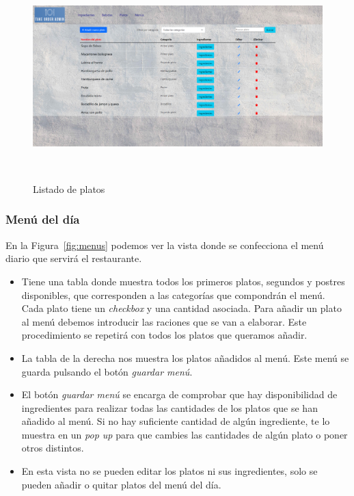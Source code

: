\begin{figure}[h]
    \centering
    \includegraphics[width=15cm, height=8cm]{Imagenes/Figuras/listaplatos.png} 
   \caption{Listado de platos \label{fig:listaplatos}}
\end{figure}

\subsubsection*{Menú del día}
En la Figura~\ref{fig:menus} podemos ver la vista donde se confecciona el menú diario que servirá el restaurante.

\begin{itemize} 

\item Tiene una tabla donde muestra todos los primeros platos, segundos y postres disponibles, que corresponden a las categorías que compondrán el menú. Cada plato tiene un \textit{checkbox} y una cantidad asociada. Para añadir un plato al menú debemos introducir las raciones que se van a elaborar. Este procedimiento se repetirá con todos los platos que queramos añadir.

\item La tabla de la derecha nos muestra los platos añadidos al menú. Este menú se guarda pulsando el botón \textit{guardar menú}.

\item El botón \textit{guardar menú} se encarga de comprobar que hay disponibilidad de ingredientes para realizar todas las cantidades de los platos que se han añadido al menú. Si no hay suficiente cantidad de algún ingrediente, te lo muestra en un \textit{pop up} para que cambies las cantidades de algún plato o poner otros distintos.

\item En esta vista no se pueden editar los platos ni sus ingredientes, solo se pueden añadir o quitar platos del menú del día.

\end{itemize}

